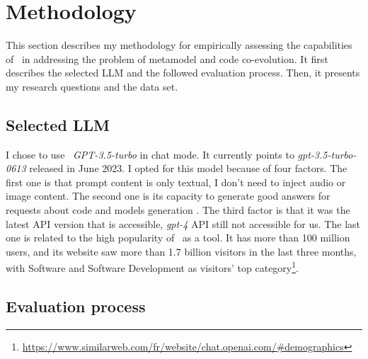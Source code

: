 \section{Methodology}
\label{ch3_evaluation}

This section describes my methodology for empirically assessing the capabilities of \LLM~in addressing the problem of metamodel and code co-evolution. 
It first describes the selected LLM and the followed evaluation process.
Then, it presents my research questions and the data set.

\subsection{Selected LLM}\label{selectedLLM}

I chose to use \LLM~\emph{GPT-3.5-turbo} in chat mode. It currently points to \emph{gpt-3.5-turbo-0613} released in June 2023. I opted for this model because of four factors. The first one is that prompt content is only textual, I don't need to inject audio or image content. The second one is its capacity to generate good answers for requests about code and models generation \cite{nathalia2023artificial,yeticstiren2023evaluating,guo2023exploring,fu2023chatgpt,kabir2023empirical,chaaben2023towards,camara2023assessment}. The third factor is that it was the latest API version that is accessible, \emph{gpt-4} API still not accessible for us. The last one is related to the high popularity of \LLM~as a tool. It has more than 100 million users, and its website saw more than 1.7 billion visitors in the last three months, with Software and Software Development as visitors' top category\footnote{\url{https://www.similarweb.com/fr/website/chat.openai.com/\#demographics}}. 


\subsection{Evaluation process}


